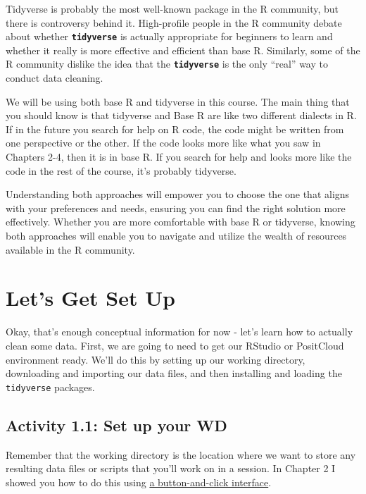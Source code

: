 \documentclass[
]{book}
\begin{document}
Tidyverse is probably the most well-known package in the R community, but there is controversy behind it. High-profile people in the R community debate about whether \textbf{\texttt{tidyverse}} is actually appropriate for beginners to learn and whether it really is more effective and efficient than base R. Similarly, some of the R community dislike the idea that the \textbf{\texttt{tidyverse}} is the only ``real'' way to conduct data cleaning.

We will be using both base R and tidyverse in this course. The main thing that you should know is that tidyverse and Base R are like two different dialects in R. If in the future you search for help on R code, the code might be written from one perspective or the other. If the code looks more like what you saw in Chapters 2-4, then it is in base R. If you search for help and looks more like the code in the rest of the course, it's probably tidyverse.

Understanding both approaches will empower you to choose the one that aligns with your preferences and needs, ensuring you can find the right solution more effectively. Whether you are more comfortable with base R or tidyverse, knowing both approaches will enable you to navigate and utilize the wealth of resources available in the R community.

\hypertarget{lets-get-set-up}{%
\section{Let's Get Set Up}\label{lets-get-set-up}}

Okay, that's enough conceptual information for now - let's learn how to actually clean some data. First, we are going to need to get our RStudio or PositCloud environment ready. We'll do this by setting up our working directory, downloading and importing our data files, and then installing and loading the \texttt{tidyverse} packages.

\hypertarget{activity-1.1-set-up-your-wd}{%
\subsection{Activity 1.1: Set up your WD}\label{activity-1.1-set-up-your-wd}}

Remember that the working directory is the location where we want to store any resulting data files or scripts that you'll work on in a session. In Chapter 2 I showed you how to do this using \protect\hyperlink{set_wd}{a button-and-click interface}.
\end{document}
